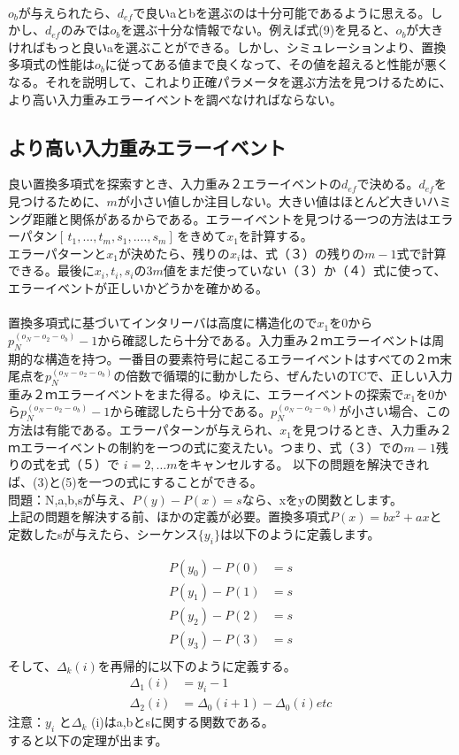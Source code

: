 \documentclass[20 pts]{article}
\begin{document}
\paragraph{}
$o_b$が与えられたら、$d_{ef}$で良いaとbを選ぶのは十分可能であるように思える。しかし、$d_{ef}$のみでは$o_b$を選ぶ十分な情報でない。例えば式(9)を見ると、$o_b$が大きければもっと良いaを選ぶことができる。しかし、シミュレーションより、置換多項式の性能は$o_b$に従ってある値まで良くなって、その値を超えると性能が悪くなる。それを説明して、これより正確パラメータを選ぶ方法を見つけるために、より高い入力重みエラーイベントを調べなければならない。

\subsection{より高い入力重みエラーイベント}
良い置換多項式を探索すとき、入力重み２エラーイベントの$d_{ef}$で決める。$d_{ef}$を見つけるために、$m$が小さい値しか注目しない。大きい値はほとんど大きいハミング距離と関係があるからである。エラーイベントを見つける一つの方法はエラーパタン$[\,t_1,...,t_m,s_1,....,s_m]\,$をきめて$x_1$を計算する。\\エラーパターンと$x_1$が決めたら、残りの$x_i$は、式（３）の残りの$ m-1$式で計算できる。最後に$x_i,t_i,s_i$の$3m$値をまだ使っていない（３）か（４）式に使って、エラーイベントが正しいかどうかを確かめる。
\paragraph{}
置換多項式に基づいてインタリーバは高度に構造化ので$x_1$を0から$p_N^{(o_N-o_2-o_b)}-1$から確認したら十分である。入力重み２ｍエラーイベントは周期的な構造を持つ。一番目の要素符号に起こるエラーイベントはすべての２ｍ末尾点を$p_N^{(o_N-o_2-o_b)}$の倍数で循環的に動かしたら、ぜんたいのTCで、正しい入力重み２ｍエラーイベントをまた得る。ゆえに、エラーイベントの探索で$x_1$を0から$p_N^{(o_N-o_2-o_b)}-1$から確認したら十分である。$p_N^{(o_N-o_2-o_b)}$が小さい場合、この方法は有能である。エラーパターンが与えられ、$x_1$を見つけるとき、入力重み２ｍエラーイベントの制約をーつの式に変えたい。つまり、式（３）での$m-1$残りの式を式（５）で $i=2,…m$をキャンセルする。
以下の問題を解決できれば、(3)と(5)を一つの式にすることができる。\\
問題：N,a,b,sが与え、$ P(y)-P(x)=s$なら、xをyの関数とします。\\上記の問題を解決する前、ほかの定義が必要。置換多項式$ P(x)= bx^2+ax$と定数したsが与えたら、シーケンス$\{y_i\}$は以下のように定義します。

\begin{align*}
P(y_0)-P(0)&=s\\
P(y_1)-P(1)&=s\\
P(y_2)-P(2)&=s\\
P(y_3)-P(3)&=s\\
\tag{16}
\end{align*}
そして、$\Delta_{k }(i)$を再帰的に以下のように定義する。
\begin{align*}
\Delta_1(i)&=y_i-1\\
\Delta_2 (i)&= \Delta_0 (i+1)- \Delta_0 (i)etc
\end{align*}
注意：$y_i$ と$\Delta_k$ (i)はa,bとsに関する関数である。\\すると以下の定理が出ます。
\end{document}
